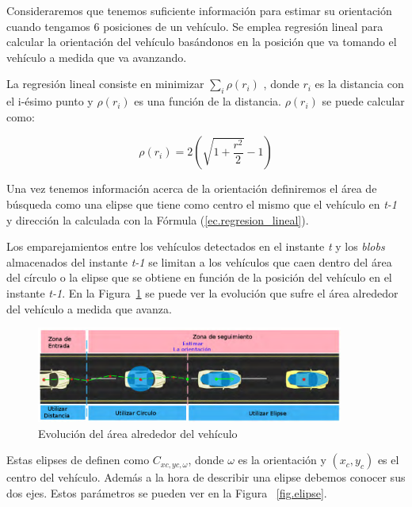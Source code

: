 Consideraremos que tenemos suficiente información para estimar su orientación cuando tengamos 6 posiciones de un vehículo. Se emplea regresión lineal para calcular la orientación del vehículo basándonos en la posición que va tomando el vehículo a medida que va avanzando. 

La regresión lineal consiste en minimizar $\sum_{i}\rho(r_i)$ , donde $r_i$  es la  distancia  con  el  i-ésimo  punto  y $\rho(r_i)$ es una función de la distancia. $\rho(r_i)$ se puede calcular como:

\begin{equation}\label{ec.regresion_lineal}
   \rho(r_i) = 2(\sqrt{1 +\frac{r^2}{2}} - 1) 
\end{equation}

Una vez tenemos información acerca de la orientación definiremos el área de búsqueda como una elipse que tiene como centro el mismo que el vehículo en \textit{t-1} y dirección la calculada con la Fórmula (\ref{ec.regresion_lineal}).

Los emparejamientos entre los vehículos detectados en el instante \textit{t} y los \textit{blobs} almacenados del instante \textit{t-1} se limitan a los vehículos que caen dentro del área del círculo o la elipse que se obtiene en función de la posición del vehículo en el instante \textit{t-1}. En la Figura~\ref{fig.area_vehiculo} se puede ver la evolución que sufre el área alrededor del vehículo a medida que avanza.

 \begin{figure}[H] 
\begin{center}
	\includegraphics[width=0.9\textwidth]{figures/Diseno_global/areas_vehiculo.png}
   \caption{Evolución del área alrededor del vehículo}
	\label{fig.area_vehiculo}
\end{center}
\end{figure}


Estas elipses de definen como $C_{xc,yc,\omega}$, donde $\omega$ es la orientación y $(x_c, y_c)$ es el centro del vehículo. Además a la hora de describir una elipse debemos conocer sus dos ejes. Estos parámetros se pueden ver en la Figura ~\ref{fig.elipse}.

